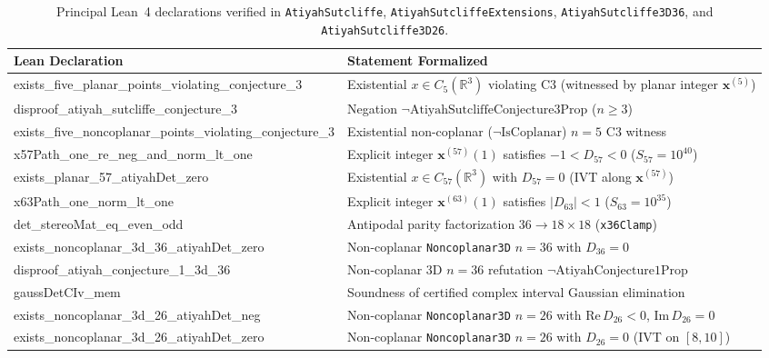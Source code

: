 \documentclass[11pt,reqno]{amsart}
\theoremstyle{remark}
\newcommand{\R}{\mathbb{R}}
\begin{document}
\begin{table}[htbp]
\centering
\scriptsize
\setlength{\tabcolsep}{4pt}
\renewcommand{\arraystretch}{0.92}
\caption{Principal Lean~4 declarations verified in \texttt{AtiyahSutcliffe}, \texttt{AtiyahSutcliffeExtensions}, \texttt{AtiyahSutcliffe3D36}, and \texttt{AtiyahSutcliffe3D26}.}
\label{tab:lean-theorems-1}
\begin{tabular}{>{\ttfamily\raggedright\arraybackslash}p{}>{\raggedright\arraybackslash}p{}}
\toprule
\textrm{Lean Declaration} & Statement Formalized \\
\midrule
exists\_five\_planar\_points\_violating\_conjecture\_3 & Existential $x \in C_5(\R^3)$ violating C3 (witnessed by planar integer $\mathbf{x}^{(5)}$) \\
disproof\_atiyah\_sutcliffe\_conjecture\_3 & Negation $\neg \mathrm{Atiyah\allowbreak Sutcliffe\allowbreak Conjecture3Prop}$ ($n \ge 3$) \\
exists\_five\_noncoplanar\_points\_violating\_conjecture\_3 & Existential non-coplanar ($\neg \mathrm{IsCoplanar}$) $n = 5$ C3 witness \\
x57Path\_one\_re\_neg\_and\_norm\_lt\_one & Explicit integer $\mathbf{x}^{(57)}(1)$ satisfies $-1 < D_{57} < 0$ ($S_{57}=10^{40}$) \\
exists\_planar\_57\_atiyahDet\_zero & Existential $x \in C_{57}(\R^3)$ with $D_{57} = 0$ (IVT along $\mathbf{x}^{(57)}$) \\
x63Path\_one\_norm\_lt\_one & Explicit integer $\mathbf{x}^{(63)}(1)$ satisfies $|D_{63}| < 1$ ($S_{63}=10^{35}$) \\
det\_stereoMat\_eq\_even\_odd & Antipodal parity factorization $36 \to 18 \times 18$ (\texttt{x36Clamp}) \\
exists\_noncoplanar\_3d\_36\_atiyahDet\_zero & Non-coplanar \texttt{Noncoplanar3D} $n = 36$ with $D_{36} = 0$ \\
disproof\_atiyah\_conjecture\_1\_3d\_36 & Non-coplanar 3D $n = 36$ refutation $\neg \mathrm{Atiyah\allowbreak Conjecture1Prop}$ \\
gaussDetCIv\_mem & Soundness of certified complex interval Gaussian elimination \\
exists\_noncoplanar\_3d\_26\_atiyahDet\_neg & Non-coplanar \texttt{Noncoplanar3D} $n = 26$ with $\mathrm{Re}\, D_{26} < 0$, $\mathrm{Im}\, D_{26} = 0$ \\
exists\_noncoplanar\_3d\_26\_atiyahDet\_zero & Non-coplanar \texttt{Noncoplanar3D} $n = 26$ with $D_{26} = 0$ (IVT on $[8, 10]$) \\

\end{tabular}
\end{table}
\end{document}
